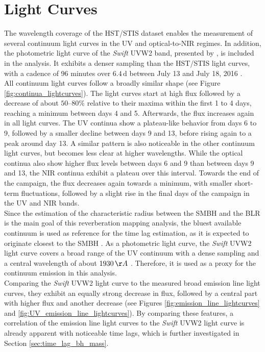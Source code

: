 \newpage
\section{Light Curves}
\label{sec:lightcurves}

The wavelength coverage of the HST/STIS dataset enables the measurement of several continuum light curves in the UV and optical-to-NIR regimes. In addition, the photometric light curve of the \textit{Swift} UVW2 band, presented by \cite{mchardy2018x}, is included in the analysis. It exhibits a denser sampling than the HST/STIS light curves, with a cadence of 96 minutes over $6.4\,\mathrm{d}$ between July 13 and July 18, 2016 \parencite{mchardy2018x}.\\ 
All continuum light curves follow a broadly similar shape (see Figure \ref{fig:continua_lightcurves}). The light curves start at high flux followed by a decrease of about $50$--$80\%$ relative to their maxima within the first 1 to 4 days, reaching a minimum between days 4 and 5. Afterwards, the flux increases again in all light curves. The UV continua show a plateau-like behavior from days 6 to 9, followed by a smaller decline between days 9 and 13, before rising again to a peak around day 13. A similar pattern is also noticeable in the other continuum light curves, but becomes less clear at higher wavelengths. While the optical continua also show higher flux levels between days 6 and 9 than between days 9 and 13, the NIR continua exhibit a plateau over this interval. Towards the end of the campaign, the flux decreases again towards a minimum, with smaller short-term fluctuations, followed by a slight rise in the final days of the campaign in the UV and NIR bands. \\
Since the estimation of the characteristic radius between the SMBH and the BLR is the main goal of this reverberation mapping analysis, the bluest available continuum is used as reference for the time lag estimation, as it is expected to originate closest to the SMBH \parencite{peterson1993}. As a photometric light curve, the \textit{Swift} UVW2 light curve covers a broad range of the UV continuum with a dense sampling and a central wavelength of about $1930\,\AA$ \parencite{mchardy2018x}. Therefore, it is used as a proxy for the continuum emission in this analysis. \\
Comparing the \textit{Swift} UVW2 light curve to the measured  broad emission line light curves, they exhibit an equally strong decrease in flux, followed by a central part with higher flux and another decrease (see Figures \ref{fig:emission_line_lightcurves} and \ref{fig:UV_emission_line_lightcurves}). By comparing these features, a correlation of the emission line light curves to the \textit{Swift} UVW2 light curve is already apparent with noticeable time lags, which is further investigated in Section \ref{sec:time_lag_bh_mass}. 



